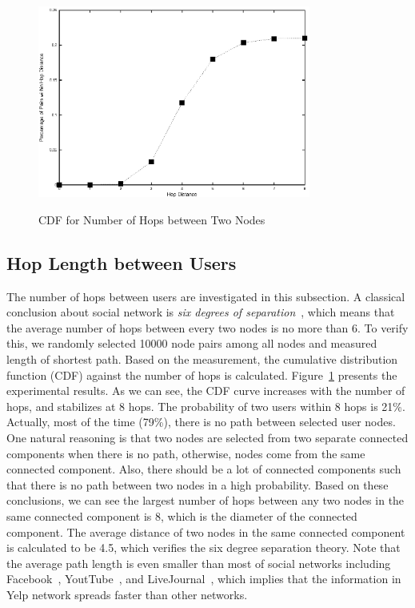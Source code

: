 \documentclass[11pt, oneside]{article}   	%
\begin{document}
\begin{figure}[t]
  \centering
  \caption{CDF for Number of Hops between Two Nodes} 
       \includegraphics[width=0.8\textwidth]{figures/hops.eps}
  \label{fig:hops}
\end{figure}

\subsection{Hop Length between Users}
The number of hops between users are investigated in this subsection. A classical conclusion about social network is
\textit{six degrees of separation}~\cite{sixdegree}, which means that the average number of hops between every two nodes 
is no more than 6. To verify this, we randomly selected 10000 node pairs among all nodes and measured length of shortest
path. Based on the measurement, the cumulative distribution function (CDF) against the number of hops is calculated. 
Figure~\ref{fig:hops} 
presents the experimental results. As we can see, the CDF curve increases with the number of hops, and stabilizes 
at 8 hops. The probability of two users within 8 hops is 21\%. Actually, most of the time (79\%), there is no path 
between selected user nodes. One natural reasoning is that two nodes are selected from two separate connected components 
when there is no path, otherwise, nodes come from the same connected component.  Also, there should be a lot of connected 
components such that there is no path between two nodes in a high probability. Based on these conclusions, 
we can see the largest number of  hops between any two nodes in the same connected component is 8, 
which is the diameter of the connected component. The average distance of two nodes in the same connected 
component is calculated to be 4.5, which verifies the six degree separation theory. Note that the average path 
length is even smaller than most of social networks including Facebook~\cite{facebook}, YoutTube~\cite{imc2007}, 
and LiveJournal~\cite{imc2007}, which implies that the information in Yelp network spreads faster than other networks.
   
\end{document}
